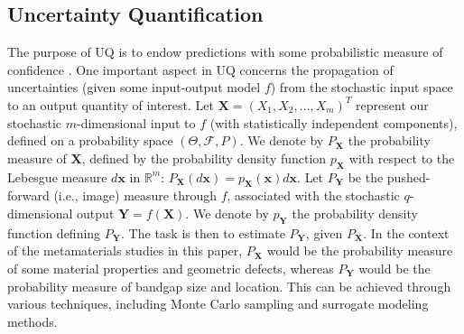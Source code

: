 \documentclass[preprint,review,12pt]{elsarticle}
\begin{document}
\subsection{Uncertainty Quantification}
\label{subsec:Uncertainty Quantification}
The purpose of UQ is to endow predictions with some probabilistic measure of confidence \citep{ghanem2017handbook}. One important aspect in UQ concerns the propagation of uncertainties (given some input-output model $f$) from the stochastic input space to an output quantity of interest. 
Let $\mathbf{X} = (X_1, X_2, \dots, X_m)^T$ represent our stochastic $m$-dimensional input to $f$ (with statistically independent components), defined on a probability space $(\Theta, \mathcal{F}, P)$. We denote by $P_{\mathbf{X}}$ the probability measure of $\mathbf{X}$, defined by the probability density function $p_{\mathbf{X}}$ with respect to the Lebesgue measure $d\mathbf{x}$ in $\mathbb{R}^m$: $P_{\mathbf{X}}(d\mathbf{x}) = p_{\mathbf{X}}(\mathbf{x})d\mathbf{x}$. Let $P_{\mathbf{Y}}$ be the pushed-forward (i.e., image) measure through $f$, associated with the stochastic $q$-dimensional output $\mathbf{Y} = f(\mathbf{X})$. We denote by $p_{\mathbf{Y}}$ the probability density function defining $P_{\mathbf{Y}}$.
The task is then to estimate $P_{\mathbf{Y}}$, given $P_{\mathbf{X}}$. In the context of the metamaterials studies in this paper, $P_{\mathbf{X}}$ would be the probability measure of some material properties and geometric defects, whereas $P_{\mathbf{Y}}$ would be the probability measure of bandgap size and location. This can be achieved through various techniques, including Monte Carlo sampling and surrogate modeling methods. %
\end{document}
